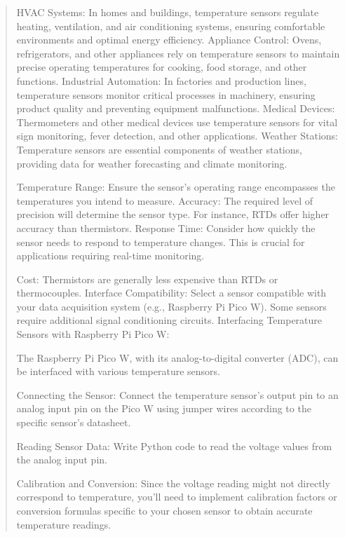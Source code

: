 \documentclass[12pt]{report}
\begin{document}
\begin{quote}
					HVAC Systems: In homes and buildings, temperature sensors regulate heating, ventilation, and air conditioning systems, ensuring comfortable environments and optimal energy efficiency.
					Appliance Control: Ovens, refrigerators, and other appliances rely on temperature sensors to maintain precise operating temperatures for cooking, food storage, and other functions.
					Industrial Automation: In factories and production lines, temperature sensors monitor critical processes in machinery, ensuring product quality and preventing equipment malfunctions.
					Medical Devices: Thermometers and other medical devices use temperature sensors for vital sign monitoring, fever detection, and other applications.
					Weather Stations: Temperature sensors are essential components of weather stations, providing data for weather forecasting and climate monitoring.
					
					Temperature Range: Ensure the sensor's operating range encompasses the temperatures you intend to measure.
					Accuracy: The required level of precision will determine the sensor type. For instance, RTDs offer higher accuracy than thermistors.
					Response Time: Consider how quickly the sensor needs to respond to temperature changes. This is crucial for applications requiring real-time monitoring.
					
					Cost: Thermistors are generally less expensive than RTDs or thermocouples.
					Interface Compatibility: Select a sensor compatible with your data acquisition system (e.g., Raspberry Pi Pico W). Some sensors require additional signal conditioning circuits.
					Interfacing Temperature Sensors with Raspberry Pi Pico W:
					
					The Raspberry Pi Pico W, with its analog-to-digital converter (ADC), can be interfaced with various temperature sensors.
					
					Connecting the Sensor: Connect the temperature sensor's output pin to an analog input pin on the Pico W using jumper wires according to the specific sensor's datasheet.
					
					Reading Sensor Data: Write Python code to read the voltage values from the analog input pin.
					
					Calibration and Conversion: Since the voltage reading might not directly correspond to temperature, you'll need to implement calibration factors or conversion formulas specific to your chosen sensor to obtain accurate temperature readings.
				\end{quote}
				\clearpage
				
\end{document}
